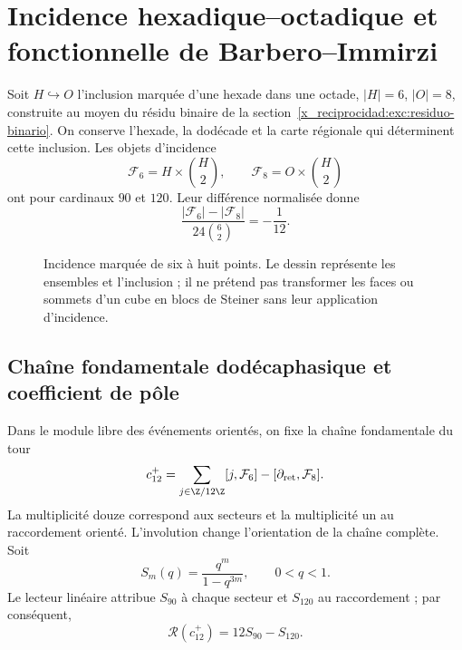 \chapter{Incidence hexadique--octadique et fonctionnelle de Barbero--Immirzi}
\label{x_reciprocidad:v:ant:sec:barbero}
Soit $H\hookrightarrow O$ l’inclusion marquée d’une hexade dans une octade,
$|H|=6$, $|O|=8$, construite au moyen du résidu binaire de la
section~\ref{x_reciprocidad:exc:residuo-binario}. On conserve l’hexade, la dodécade
et la carte régionale qui déterminent cette inclusion.
Les objets d’incidence
\[
\mathcal F_6=H\times\binom H2,\qquad
\mathcal F_8=O\times\binom H2
\]
ont pour cardinaux $90$ et $120$. Leur différence normalisée donne
\[
\frac{|\mathcal F_6|-|\mathcal F_8|}{24\binom62}=-\frac1{12}.
\]
\begin{figure}[htbp]
\centering
{}
\caption{Incidence marquée de six à huit points. Le dessin représente
les ensembles et l'inclusion ; il ne prétend pas transformer les faces ou sommets
d'un cube en blocs de Steiner sans leur application d'incidence.}
\end{figure}

\section{Chaîne fondamentale dodécaphasique et coefficient de pôle}
Dans le module libre des événements orientés, on fixe la chaîne
fondamentale du tour
\[
c_{12}^{+}=
\sum_{j\in\Z/12\Z}[j,\mathcal F_6]
-[\partial_{\rm ret},\mathcal F_8].
\]
La multiplicité douze correspond aux secteurs et la multiplicité un
au raccordement orienté. L'involution change l'orientation de la chaîne
complète. Soit
\[
S_m(q)=\frac{q^m}{1-q^{3m}},\qquad 0<q<1.
\]
Le lecteur linéaire attribue $S_{90}$ à chaque secteur et $S_{120}$ au raccordement ;
par conséquent,
\[
\mathscr R(c_{12}^{+})=12S_{90}-S_{120}.
\]


